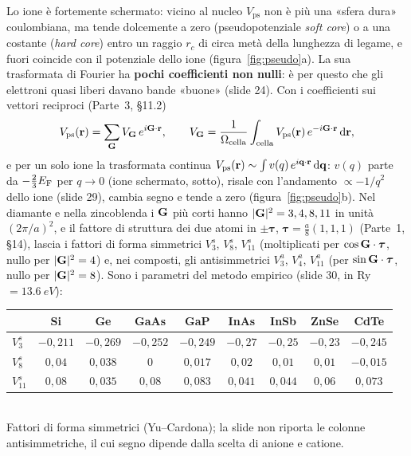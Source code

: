 \documentclass[11pt,a4paper]{article}
\begin{document}
Lo ione è fortemente schermato: vicino al nucleo $V_{\mathrm{ps}}$ non è più una «sfera dura» coulombiana, ma tende dolcemente a zero
(pseudopotenziale \emph{soft core}) o a una costante (\emph{hard core}) entro un raggio $r_c$ di circa metà della lunghezza di legame, e fuori
coincide con il potenziale dello ione (figura~\ref{fig:pseudo}a). La sua trasformata di Fourier ha \textbf{pochi coefficienti non nulli}: è per questo
che gli elettroni quasi liberi davano bande «buone» (slide 24). Con i coefficienti sui vettori reciproci (Parte~3, §11.2)
\[
V_{\mathrm{ps}}(\mathbf r)=\sum_{\mathbf G}V_{\mathbf G}\,e^{i\mathbf G\cdot\mathbf r},\qquad V_{\mathbf G}=\frac1{\Omega_{\mathrm{cella}}}\int_{\text{cella}}V_{\mathrm{ps}}(\mathbf r)\,e^{-i\mathbf G\cdot\mathbf r}\,\mathrm d\mathbf r ,
\]
e per un solo ione la trasformata continua $V_{\mathrm{ps}}(\mathbf r)\sim\int v(q)\,e^{i\mathbf q\cdot\mathbf r}\,\mathrm d\mathbf q$: $v(q)$ parte da $-\frac23E_{\mathrm F}$ per $q\to0$
(ione schermato, sotto), risale con l'andamento $\propto-1/q^2$ dello ione (slide 29), cambia segno e tende a zero (figura~\ref{fig:pseudo}b). Nel diamante e nella zincoblenda i $\mathbf G$
più corti hanno $|\mathbf G|^2=3,4,8,11$ in unità $(2\pi/a)^2$, e il fattore di struttura dei due atomi in $\pm\boldsymbol\tau$,
$\boldsymbol\tau=\frac a8(1,1,1)$ (Parte~1, §14), lascia i fattori di forma  simmetrici $V^s_3$, $V^s_8$, $V^s_{11}$ (moltiplicati
per $\cos\mathbf G\cdot\boldsymbol\tau$, nullo per $|\mathbf G|^2=4$) e, nei composti, gli antisimmetrici $V^a_3$, $V^a_4$, $V^a_{11}$ (per
$\sin\mathbf G\cdot\boldsymbol\tau$, nullo per $|\mathbf G|^2=8$). Sono i parametri del metodo empirico (slide 30, in Ry $=\SI{13.6}{eV}$):
\begin{center}\small
\begin{tabular}{@{}lcccccccc@{}}
\toprule
& Si & Ge & GaAs & GaP & InAs & InSb & ZnSe & CdTe\\
\midrule
$V^s_3$ & $-0{,}211$ & $-0{,}269$ & $-0{,}252$ & $-0{,}249$ & $-0{,}27$ & $-0{,}25$ & $-0{,}23$ & $-0{,}245$\\
$V^s_8$ & $0{,}04$ & $0{,}038$ & $0$ & $0{,}017$ & $0{,}02$ & $0{,}01$ & $0{,}01$ & $-0{,}015$\\
$V^s_{11}$ & $0{,}08$ & $0{,}035$ & $0{,}08$ & $0{,}083$ & $0{,}041$ & $0{,}044$ & $0{,}06$ & $0{,}073$\\
\bottomrule
\end{tabular}\\[3pt]
{\footnotesize Fattori di forma simmetrici (Yu--Cardona); la slide non riporta le colonne antisimmetriche, il cui segno dipende dalla scelta di
anione e catione.}
\end{center}
\end{document}
